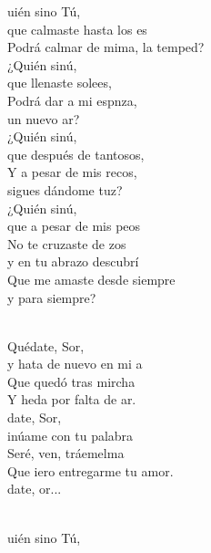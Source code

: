 \begin{cancion}%
	uién sino Tú,\\
	que calmaste hasta los es\\
	Podrá calmar de mima, la temped?\\
	¿Quién sinú, \\
	que llenaste solees,\\
	Podrá dar a mi espnza, \\
	un nuevo ar?\\
	¿Quién sinú, \\
	que después de tantosos, \\
	Y a pesar de mis recos,\\
	sigues dándome tuz?\\
	¿Quién sinú, \\
	que a pesar de mis peos\\
	No te cruzaste de zos\\
y en tu abrazo descubrí\\
Que me amaste desde siempre \\
y para siempre?\\\jump\\
	\begin{chorus}%
	Quédate, Sor,\\
	y hata de nuevo en mi a\\
	Que  quedó tras mircha\\
	Y heda por falta de ar.\\
	date, Sor, \\
	inúame con tu palabra\\
	Seré, ven, tráemelma \\
	Que iero entregarme tu amor.\\
	date, or...          \\
	\end{chorus}%
	\jump\\
	uién sino Tú,\\

\end{cancion}
